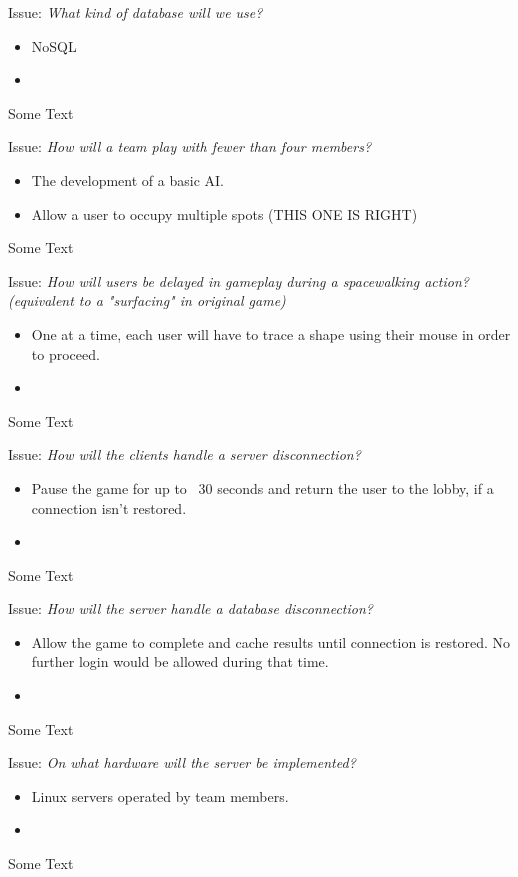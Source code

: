 Issue: \textit{What kind of database will we use?}

  \begin{itemize}
    \item NoSQL
    \item 
  \end{itemize}

Some Text

Issue: \textit{How will a team play with fewer than four members?}

  \begin{itemize}
    \item The development of a basic AI.
    \item Allow a user to occupy multiple spots (THIS ONE IS RIGHT)
  \end{itemize}

Some Text

Issue: \textit{How will users be delayed in gameplay during a spacewalking action? (equivalent to a "surfacing" in original game)}

  \begin{itemize}
    \item One at a time, each user will have to trace a shape using their mouse in order to proceed.
    \item 
  \end{itemize}

Some Text

Issue: \textit{How will the clients handle a server disconnection?}

  \begin{itemize}
    \item Pause the game for up to ~30 seconds and return the user to the lobby, if a connection isn't restored.
    \item 
  \end{itemize}

Some Text

Issue: \textit{How will the server handle a database disconnection?}

  \begin{itemize}
    \item Allow the game to complete and cache results until connection is restored. No further login would be allowed during that time.
    \item 
  \end{itemize}

Some Text

Issue: \textit{On what hardware will the server be implemented?}

  \begin{itemize}
    \item Linux servers operated by team members.
    \item 
  \end{itemize}

Some Text
